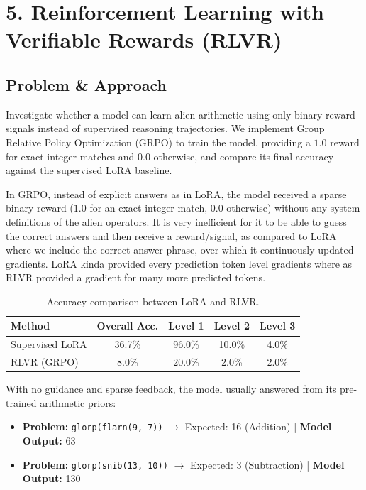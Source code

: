 \section*{5. Reinforcement Learning with Verifiable Rewards (RLVR)}

\subsection*{Problem \& Approach}
Investigate whether a model can learn alien arithmetic using only binary reward signals instead of supervised reasoning trajectories. We implement Group Relative Policy Optimization (GRPO) to train the model, providing a $1.0$ reward for exact integer matches and $0.0$ otherwise, and compare its final accuracy against the supervised LoRA baseline.


In GRPO, instead of explicit answers as in LoRA, the model received a sparse binary reward ($1.0$ for an exact integer match, $0.0$ otherwise) without any system definitions of the alien operators. It is very inefficient for it to be able to guess the correct answers and then receive a reward/signal, as compared to LoRA where we include the correct answer phrase, over which it continuously updated gradients.
LoRA kinda provided every prediction token level gradients where as RLVR provided a gradient for many more predicted tokens.
\begin{table}[h]
\centering
\begin{tabular}{l c c c c}
\toprule
\textbf{Method} & \textbf{Overall Acc.} & \textbf{Level 1} & \textbf{Level 2} & \textbf{Level 3} \\
\midrule
Supervised LoRA & 36.7\% & 96.0\% & 10.0\% & 4.0\% \\
RLVR (GRPO) & 8.0\% & 20.0\% & 2.0\% & 2.0\% \\
\bottomrule
\end{tabular}
\caption{Accuracy comparison between LoRA and RLVR.}
\label{tab:rlvr_results}
\end{table}

With no guidance and sparse feedback, the model usually answered from its pre-trained arithmetic priors:
\begin{itemize}
    \item \textbf{Problem:} \texttt{glorp(flarn(9, 7))} $\rightarrow$ Expected: 16 (Addition) | \textbf{Model Output:} 63
    \item \textbf{Problem:} \texttt{glorp(snib(13, 10))} $\rightarrow$ Expected: 3 (Subtraction) | \textbf{Model Output:} 130
\end{itemize}
